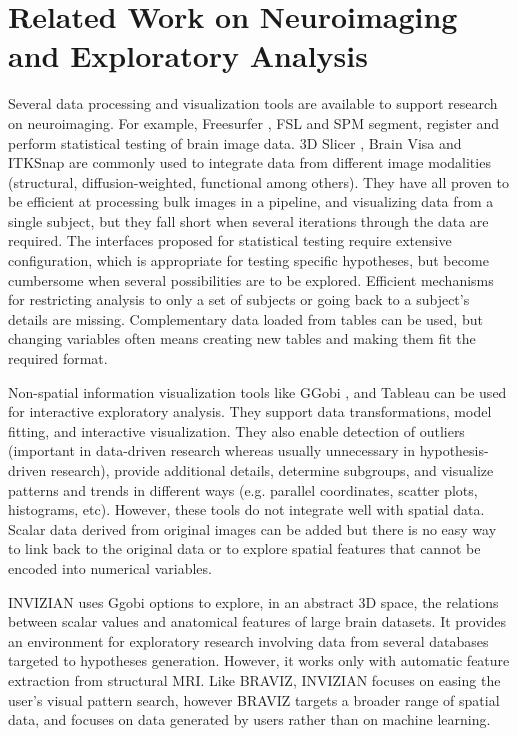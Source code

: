 \documentclass{frontiersHLTH}
\begin{document}
\section{Related Work on Neuroimaging and Exploratory Analysis}


Several data processing and visualization tools are available to support research on neuroimaging. For example, Freesurfer \cite{fischl_freesurfer_2012}, FSL \cite{jenkinson_fsl_2012} and SPM \cite{friston_statistical_2006} segment, register and perform statistical testing of brain image data. 3D Slicer \cite{fedorov_3d_2012}, Brain Visa \cite{cointepas_brainvisa:_2001} and ITKSnap \cite{yushkevich_user-guided_2006} are commonly used to integrate data from different image modalities (structural, diffusion-weighted, functional among others). They have all proven to be efficient at processing bulk images in a pipeline, and visualizing data from a single subject, but they fall short when several iterations through the data are required. The interfaces proposed for statistical testing require extensive configuration, which is appropriate for testing specific hypotheses, but become cumbersome when several possibilities are to be explored. Efficient mechanisms for restricting analysis to only a set of subjects or going back to a subject's details are missing. Complementary data loaded from tables can be used, but changing variables often means creating new tables and making them fit the required format.


Non-spatial information visualization tools like GGobi \cite{cook_interactive_2007}, and Tableau\cite{hanrahan_tableau_2003} can be used for interactive exploratory analysis. They support data transformations, model fitting, and interactive visualization. They also enable  detection of outliers (important in data-driven research whereas usually unnecessary in hypothesis-driven research), provide additional details, determine subgroups, and visualize patterns and trends in different ways (e.g. parallel coordinates, scatter plots, histograms, etc). However, these tools do not integrate well with spatial data. Scalar data derived from original images can be added but there is no easy way to link back to the original data or to explore spatial features that cannot be encoded into numerical variables.

INVIZIAN \cite{bowman_query-based_2011}\cite{bowman_feature-similarity_2012}\cite{bowman_visual_2012} uses Ggobi options to explore, in an abstract 3D space, the relations between scalar values and anatomical features of large brain datasets. It provides an environment for exploratory research involving data from several databases targeted to hypotheses generation. However, it works only with automatic feature extraction from structural MRI. Like BRAVIZ, INVIZIAN focuses on easing the user’s visual pattern search, however BRAVIZ targets a broader range of spatial data, and focuses on data generated by users rather than on machine learning. 
\end{document}

